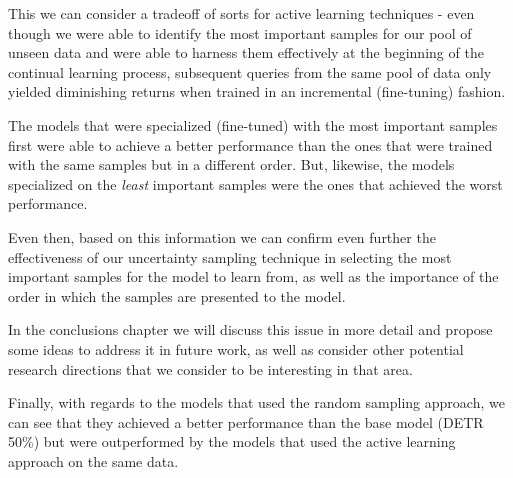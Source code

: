 \documentclass[../main.tex]{subfiles}
\begin{document}
This we can consider a tradeoff of sorts for active learning techniques - even though we were able to identify the most important samples for our pool of unseen data and were able to harness them effectively at the beginning of the continual learning process, subsequent queries from the same pool of data only yielded diminishing returns when trained in an incremental (fine-tuning) fashion.

The models that were specialized (fine-tuned) with the most important samples first were able to achieve a better performance than the ones that were trained with the same samples but in a different order. But, likewise, the models specialized on the \textit{least} important samples were the ones that achieved the worst performance.

Even then, based on this information we can confirm even further the effectiveness of our uncertainty sampling technique in selecting the most important samples for the model to learn from, as well as the importance of the order in which the samples are presented to the model. 


In the conclusions chapter we will discuss this issue in more detail and propose some ideas to address it in future work, as well as consider other potential research directions that we consider to be interesting in that area.

Finally, with regards to the models that used the random sampling approach, we can see that they achieved a better performance than the base model (DETR 50\%) but were outperformed by the models that used the active learning approach on the same data.

\end{document}
